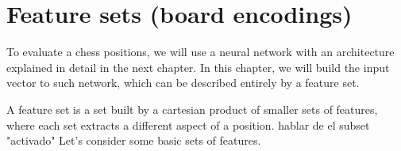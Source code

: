\newcommand{\white}{\fullmoon}
\newcommand{\black}{\newmoon}

\newcommand{\bigtimes}{\mathop{\raisebox{-0.5ex}{\scalebox{2}{$\times$}}}}

\newcommand{\pieceBoard}{
    \newcount\pieceindex
    \setcounter{pieceindex}{0}
    \raisebox{-7ex}{
        \centering
        \chessboard[
            tinyboard,
            showmover=false,
            margin=false,
            padding=false,
            hlabel=false,
            vlabel=false,
            pgfstyle={text},
            text=\fontsize{1.2ex}{1.2ex}\bfseries\sffamily \currentwq,
            markboard
        ]
    }
}
\newcommand{\pieceRolesTable}{
    \begin{tabular}{|l|}
        \hline
        \sympawn\ Pawn \\
        \hline
        \symknight\ Knight \\
        \hline
        \symbishop\ Bishop \\
        \hline
        \symrook\ Rook \\
        \hline
        \symqueen\ Queen \\
        \hline
        \symking\ King \\
        \hline
    \end{tabular}
}
\newcommand{\pieceColorsTable}{
    \begin{tabular}{|l|}
        \hline
        $\white$ White \\
        \hline
        $\black$ Black \\
        \hline
    \end{tabular}
}

\newcommand{\fs}[1]{\textsc{#1}}


\section{Feature sets (board encodings)}

To evaluate a chess positions, we will use a neural network with an architecture explained in detail in the next chapter. In this chapter, we will build the input vector to such network, which can be described entirely by a feature set.

A feature set is a set built by a cartesian product of smaller sets of features, where each set extracts a different aspect of a position. hablar de el subset "activado" Let's consider some basic sets of features.

